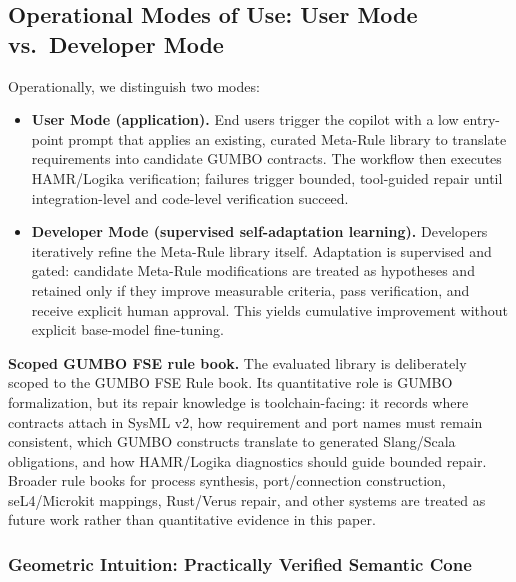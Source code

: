 \documentclass[conference]{IEEEtran}
\begin{document}

\subsection{Operational Modes of Use: User Mode vs.\ Developer Mode}
Operationally, we distinguish two modes:
\begin{itemize}
\item \textbf{User Mode (application).} End users trigger the copilot with a low entry-point prompt that applies an existing, curated Meta-Rule library to translate requirements into candidate GUMBO contracts. The workflow then executes HAMR/Logika verification; failures trigger bounded, tool-guided repair until integration-level and code-level verification succeed.
\item \textbf{Developer Mode (supervised self-adaptation learning).} Developers iteratively refine the Meta-Rule library itself. Adaptation is supervised and gated: candidate Meta-Rule modifications are treated as hypotheses and retained only if they improve measurable criteria, pass verification, and receive explicit human approval. This yields cumulative improvement without explicit base-model fine-tuning.
\end{itemize}

\noindent\textbf{Scoped GUMBO FSE rule book.}
The evaluated library is deliberately scoped to the GUMBO FSE Rule book. Its quantitative role is GUMBO formalization, but its repair knowledge is toolchain-facing: it records where contracts attach in SysML v2, how requirement and port names must remain consistent, which GUMBO constructs translate to generated Slang/Scala obligations, and how HAMR/Logika diagnostics should guide bounded repair. Broader rule books for process synthesis, port/connection construction, seL4/Microkit mappings, Rust/Verus repair, and other systems are treated as future work rather than quantitative evidence in this paper.

\subsubsection{Geometric Intuition: Practically Verified Semantic Cone}
\label{sec:vsc-intuition}
\end{document}
